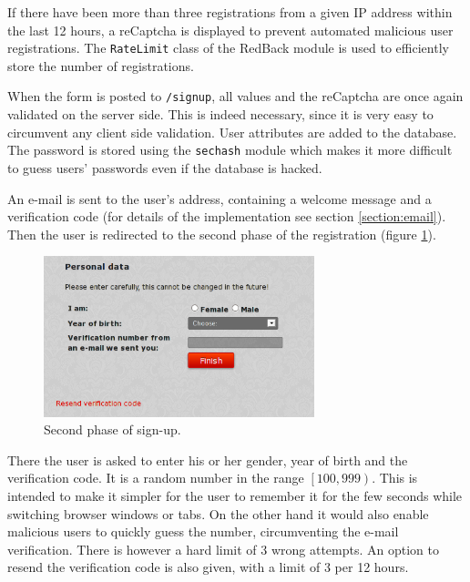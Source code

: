 \documentclass[12pt,oneside]{fithesis}
\begin{document}
		If there have been more than three registrations from a given IP address within the last 12 hours, a reCaptcha is displayed to prevent automated malicious user registrations. The \texttt{RateLimit} class of the RedBack module is used to efficiently store the number of registrations.
		
		When the form is posted to \texttt{/signup}, all values and the reCaptcha are once again validated on the server side. This is indeed necessary, since it is very easy to circumvent any client side validation. User attributes are added to the database. The password is stored using the \texttt{sechash} module which makes it more difficult to guess users' passwords even if the database is hacked.
		
		An e-mail is sent to the user's address, containing a welcome message and a verification code (for details of the implementation see section \ref{section:email}). Then the user is redirected to the second phase of the registration (figure \ref{fig:screen-signup1}).
		
		\begin{figure}[h]
	  \centering
	    \includegraphics[width=0.7\textwidth]{screen-signup1.png}
		  \caption{Second phase of sign-up.}
		  \label{fig:screen-signup1}
	  \end{figure}
	  There the user is asked to enter his or her gender, year of birth and the verification code. It is a random number in the range $\left[ 100,999\right)$. This is intended to make it simpler for the user to remember it for the few seconds while switching browser windows or tabs. On the other hand it would also enable malicious users to quickly guess the number, circumventing the e-mail verification. There is however a hard limit of 3 wrong attempts. An option to resend the verification code is also given, with a limit of 3 per 12 hours.
	  
\end{document}
